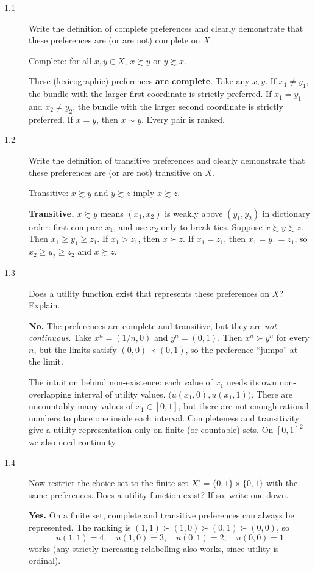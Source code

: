 \begin{description}
\item[1.1] Write the definition of complete preferences and clearly demonstrate that these preferences are (or are not) complete on $X$.
\begin{solution}
Complete: for all $x,y\in X$, $x\succsim y$ or $y\succsim x$.

These (lexicographic) preferences \textbf{are complete}. Take any $x,y$. If $x_1\neq y_1$, the bundle with the larger first coordinate is strictly preferred. If $x_1=y_1$ and $x_2\ne y_2$, the bundle with the larger second coordinate is strictly preferred. If $x=y$, then $x\sim y$. Every pair is ranked.
\end{solution}
\item[1.2] Write the definition of transitive preferences and clearly demonstrate that these preferences are (or are not) transitive on $X$.
\begin{solution}
Transitive: $x\succsim y$ and $y\succsim z$ imply $x\succsim z$.

\textbf{Transitive.} $x\succsim y$ means $(x_1,x_2)$ is weakly above $(y_1,y_2)$ in dictionary order: first compare $x_1$, and use $x_2$ only to break ties. Suppose $x\succsim y\succsim z$. Then $x_1\ge y_1\ge z_1$. If $x_1>z_1$, then $x\succ z$. If $x_1=z_1$, then $x_1=y_1=z_1$, so $x_2\ge y_2\ge z_2$ and $x\succsim z$.
\end{solution}
\item[1.3] Does a utility function exist that represents these preferences on $X$? Explain.
\begin{solution}
\textbf{No.} The preferences are complete and transitive, but they are \emph{not continuous}. Take $x^n=(1/n,0)$ and $y^n=(0,1)$. Then $x^n\succ y^n$ for every $n$, but the limits satisfy $(0,0)\prec(0,1)$, so the preference ``jumps'' at the limit.

The intuition behind non-existence: each value of $x_1$ needs its own non-overlapping interval of utility values, $\big(u(x_1,0),u(x_1,1)\big)$. There are uncountably many values of $x_1\in[0,1]$, but there are not enough rational numbers to place one inside each interval. Completeness and transitivity give a utility representation only on finite (or countable) sets. On $[0,1]^2$ we also need continuity.
\end{solution}
\item[1.4] Now restrict the choice set to the finite set $X'=\{0,1\}\times\{0,1\}$ with the same preferences. Does a utility function exist? If so, write one down.
\begin{solution}
\textbf{Yes.} On a finite set, complete and transitive preferences can always be represented. The ranking is $(1,1)\succ(1,0)\succ(0,1)\succ(0,0)$, so
\[u(1,1)=4,\quad u(1,0)=3,\quad u(0,1)=2,\quad u(0,0)=1\]
works (any strictly increasing relabelling also works, since utility is ordinal).
\end{solution}
\end{description}

